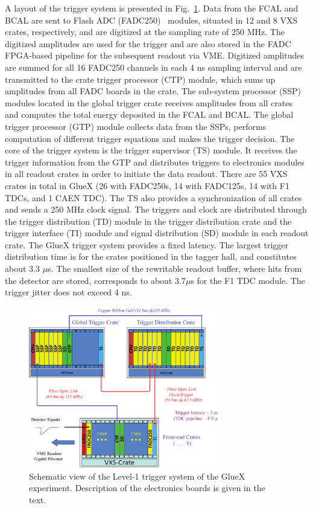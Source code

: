 A layout of the trigger system is presented in Fig.~\ref{fig:trig}. Data from the FCAL and BCAL are sent to  Flash ADC (FADC250)~\cite{Dong:2007} modules, situated in 12 and 8 VXS crates, respectively, and are digitized at the sampling rate of 250 MHz. The digitized amplitudes are used for the trigger and are also stored in the FADC FPGA-based pipeline for the subsequent readout via VME.
Digitized amplitudes are summed for all 16 FADC250 channels in each 4 ns sampling interval and are transmitted to the crate trigger processor (CTP) module, which sums up amplitudes from all FADC boards in the crate. The sub-system processor (SSP) modules located in the global trigger crate receives amplitudes from all crates and computes the total energy deposited in the FCAL and BCAL. The global trigger processor (GTP) module collects data from the SSPs, performs computation of different trigger equations and makes the trigger decision. The core of the trigger system is the trigger supervisor (TS) module. It receives the trigger information from the GTP and distributes triggers to electronics modules in all readout 
crates in order to initiate the data readout. There are 55 VXS crates in total in GlueX (26 with FADC250s, 14 with  FADC125s, 14 with F1 TDCs, and 1 CAEN TDC). The TS also provides a synchronization of all crates and sends a 250 MHz clock signal. The triggers and clock are distributed through the trigger distribution (TD) module in the trigger distribution crate and the trigger interface (TI) module and signal distribution (SD) module in each readout crate. The GlueX trigger system provides a fixed latency. The largest trigger distribution time is for the crates positioned in the tagger hall, and constitutes about 3.3 $\mu$s. 
The smallest size of the rewritable readout buffer, where hits from the detector are stored, corresponds to about 3.7$\mu$s for the F1 TDC module. The trigger jitter does not exceed 4 ns.


\begin{figure}[tbp]
\begin{center}
\includegraphics[width=0.75\textwidth]{figures/125_Somov-f1.pdf}  
\caption{Schematic view of the Level-1 trigger system of the GlueX experiment. Description of the electronics boards is given in the text.} \label{fig:trig}
\end{center}
\end{figure}

